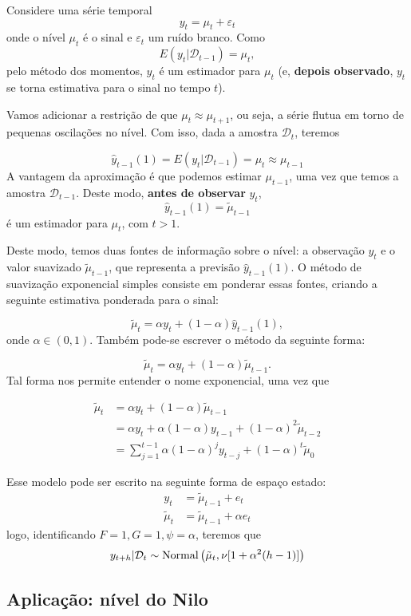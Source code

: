\documentclass[
  letterpaper,
  DIV=11,
  numbers=noendperiod]{scrreprt}
\theoremstyle{definition}
\theoremstyle{plain}
\theoremstyle{definition}
\theoremstyle{plain}
\theoremstyle{remark}
\begin{document}
Considere uma série temporal \[y_t = \mu_t+\varepsilon_t\] onde o nível
\(\mu_t\) é o sinal e \(\varepsilon_t\) um ruído branco. Como
\[E(y_t|\mathcal{D}_{t-1})=\mu_t,\] pelo método dos momentos, \(y_t\) é
um estimador para \(\mu_t\) (e, \textbf{depois observado}, \(y_t\) se
torna estimativa para o sinal no tempo \(t\)).

Vamos adicionar a restrição de que \(\mu_t\approx \mu_{t+1}\), ou seja,
a série flutua em torno de pequenas oscilações no nível. Com isso, dada
a amostra \(\mathcal{D}_t\), teremos

\[\hat{y}_{t-1}(1)=E(y_{t}|\mathcal{D}_{t-1})=\mu_{t}\approx \mu_{t-1}\]
A vantagem da aproximação é que podemos estimar \(\mu_{t-1}\), uma vez
que temos a amostra \(\mathcal{D}_{t-1}\). Deste modo, \textbf{antes de
observar} \(y_t\),\\
\[\hat{y}_{t-1}(1)=\tilde{\mu}_{t-1}\] é um estimador para \(\mu_t\),
com \(t>1\).

Deste modo, temos duas fontes de informação sobre o nível: a observação
\(y_t\) e o valor suavizado \(\tilde{\mu}_{t-1}\), que representa a
previsão \(\hat{y}_{t-1}(1)\). O método de suavização exponencial
simples consiste em ponderar essas fontes, criando a seguinte estimativa
ponderada para o sinal:

\[\tilde{\mu}_t=\alpha y_t + (1-\alpha)\hat{y}_{t-1}(1),\] onde
\(\alpha\in(0,1)\). Também pode-se escrever o método da seguinte forma:

\[\tilde{\mu}_t=\alpha y_t + (1-\alpha)\tilde{\mu}_{t-1}.\] Tal forma
nos permite entender o nome exponencial, uma vez que

\[\begin{align}\tilde{\mu}_t&=\alpha y_t + (1-\alpha)\tilde{\mu}_{t-1}\\&=\alpha y_t + \alpha(1-\alpha)y_{t-1}+(1-\alpha)^2 \tilde{\mu}_{t-2}\\&=\sum_{j=1}^{t-1}\alpha(1-\alpha)^jy_{t-j}+(1-\alpha)^t\tilde{\mu}_0\end{align}\]

Esse modelo pode ser escrito na seguinte forma de espaço estado:
\[\begin{align}
y_t&=\tilde{\mu}_{t-1}+e_t\\
\tilde{\mu}_{t}&=\tilde{\mu}_{t-1}+\alpha e_t
\end{align}\] logo, identificando \(F=1, G=1,\psi=\alpha\), teremos que
\[y_{t+h}|\mathcal{D}_t\sim\hbox{Normal}\left(\tilde{\mu}_t,\nu[1+\alpha^2(h-1)]\right)\]

\hypertarget{aplicauxe7uxe3o-nuxedvel-do-nilo}{%
\subsection{Aplicação: nível do
Nilo}\label{aplicauxe7uxe3o-nuxedvel-do-nilo}}
\end{document}

